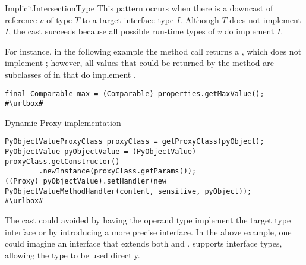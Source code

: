 \begin{pattern}{ImplicitIntersectionType}
This pattern occurs when there is a downcast of reference $v$ of type $T$ to a
target
interface type $I$.
Although $T$ does not implement $I$, 
the cast succeeds because all possible run-time types of $v$
do implement $I$.

\instances{}
For instance, in the following example%
\def\urlvar{http://bit.ly/senbox_org_snap_desktop_2FQOt4v}
the method call returns a , which does not implement
; however,
all values that could be returned by the method
are subclasses of  in 
that do implement .

\begin{verbatim}
final Comparable max = (Comparable) properties.getMaxValue();
#\urlbox#
\end{verbatim}

Dynamic Proxy implementation
\def\urlvar{http://bit.ly/CloudSlang_cloud_slang_2EkgP4l}

\begin{verbatim}
PyObjectValueProxyClass proxyClass = getProxyClass(pyObject);
PyObjectValue pyObjectValue = (PyObjectValue) proxyClass.getConstructor()
        .newInstance(proxyClass.getParams());
((Proxy) pyObjectValue).setHandler(new PyObjectValueMethodHandler(content, sensitive, pyObject));
#\urlbox#
\end{verbatim}

\discussion{}
The cast could avoided by having the operand type implement the target type
  interface or by introducing a more precise interface.
  In the above example, one could imagine an interface
   that extends both  and
  . \scala{} supports
  interface types, allowing 
  the type 
  to be used directly.

\end{pattern}